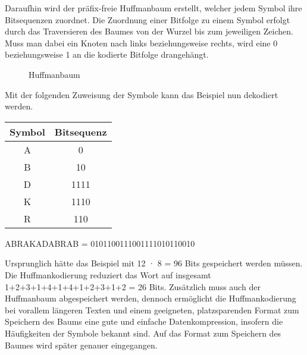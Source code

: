 \documentclass[course=erap]{aspdoc}
\begin{document}
Daraufhin wird der präfix-freie Huffmanbaum erstellt, welcher jedem Symbol ihre Bitsequenzen zuordnet. Die Zuordnung einer Bitfolge zu einem Symbol erfolgt durch das Traversieren %
des Baumes von der Wurzel bis zum jeweiligen Zeichen. Muss man dabei ein Knoten nach links beziehungsweise rechts, wird eine 0 beziehungsweise 1 an die kodierte Bitfolge drangehängt.


\begin{figure}
    \centering
    \caption{Huffmanbaum}
    \label{fig:my_label}
\end{figure}


Mit der folgenden Zuweisung der Symbole kann das Beispiel nun dekodiert werden.

\begin{center}
    \begin{tabular}{c|c}
        \textbf{Symbol} & \textbf{Bitsequenz} \\
        \hline
        A & 0 \\
        B & 10\\
        D & 1111\\
        K & 1110\\
        R & 110
    \end{tabular}
    \label{tab:my_label}
\end{center}
\begin{center}
    ABRAKADABRAB = 0101100111001111010110010
\end{center}

Ursprunglich hätte das Beispiel mit 12 · 8 = 96 Bits gespeichert werden müssen. Die Huffmankodierung reduziert das Wort auf insgesamt 1+2+3+1+4+1+4+1+2+3+1+2 = 26 Bits. Zusätzlich muss auch der Huffmanbaum abgespeichert werden, dennoch ermöglicht die Huffmankodierung bei vorallem längeren Texten und einem geeigneten, platzsparenden Format zum Speichern des Baums eine gute und einfache Datenkompression, insofern die Häufigkeiten der Symbole bekannt sind. Auf das Format zum Speichern des Baumes wird später genauer eingegangen.\cite{4051119}
\end{document}
